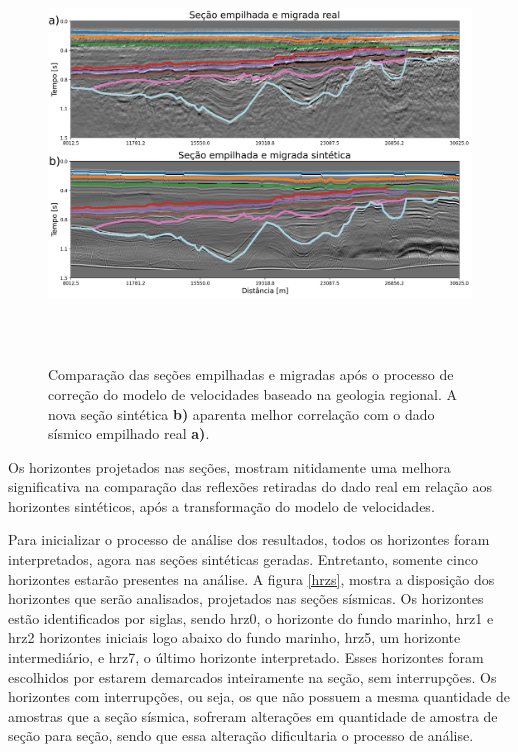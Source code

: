 \documentclass[
	12pt,				%
	openright,			%
	oneside,			%
	a4paper,			%
	english,			%
	brazil				%
	]{abntex2}
\begin{document}
	\begin{figure}[htp!]
		\centering
		\includegraphics[width=16cm,height=11cm]{../imagens/comparision1HRZ.png}
		\caption{Comparação das seções empilhadas e migradas após o processo de correção do modelo de velocidades baseado na geologia regional. A nova seção sintética \textbf{b)} aparenta melhor correlação com o dado sísmico empilhado real \textbf{a)}.}
		\label{comparisionCorr}
	\end{figure}
	
	Os horizontes projetados nas seções, mostram nitidamente uma melhora significativa na comparação das reflexões retiradas do dado real em relação aos horizontes sintéticos, após a transformação do modelo de velocidades.
	
	Para inicializar o processo de análise dos resultados, todos os horizontes foram interpretados, agora nas seções sintéticas geradas. Entretanto, somente cinco horizontes estarão presentes na análise. A figura \ref{hrzs}, mostra a disposição dos horizontes que serão analisados, projetados nas seções sísmicas. Os horizontes estão identificados por siglas, sendo hrz0, o horizonte do fundo marinho, hrz1 e hrz2 horizontes iniciais logo abaixo do fundo marinho, hrz5, um horizonte intermediário, e hrz7, o último horizonte interpretado. Esses horizontes foram escolhidos por estarem demarcados inteiramente na seção, sem interrupções. Os horizontes com interrupções, ou seja, os que não possuem a mesma quantidade de amostras que a seção sísmica, sofreram alterações em quantidade de amostra de seção para seção, sendo que essa alteração dificultaria o processo de análise.     
\end{document}
